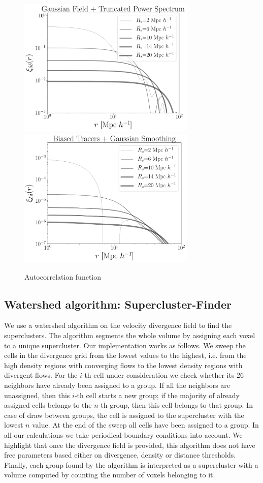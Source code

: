 \documentclass[usenatbib]{mnras}
\begin{document}
\begin{figure}
    \centering
    \includegraphics[width=240pt]{plot_corrfunc_field_rs.pdf}
    \includegraphics[width=240pt]{plot_corrfunc_tracers_rs.pdf}
    \caption{Autocorrelation function}
    \label{fig:power_spectrum}
\end{figure}

\subsection{Watershed algorithm: Supercluster-Finder}

We use a watershed algorithm \citep{BeucherWatershed1979} on the velocity divergence field to find the
superclusters.
The algorithm segments the whole volume by assigning each voxel to a unique supercluster. 
Our implementation works as follows. 
We sweep the cells in the divergence grid from the lowest values to the highest, i.e. from
the high density regions with converging flows to the lowest density regions with divergent
flows.
For the $i$-th cell under consideration we check whether its 26 neighbors have already been assigned to a group. 
If all the neighbors are unassigned, then this $i$-th cell starts a
new group; if the majority of already assigned cells belongs to the
$n$-th group, then this cell belongs to that group.
In case of draw between groups, the cell is assigned to the supercluster with the lowest $n$ value.
At the end of the sweep all cells have been assigned to a group. 
In all our calculations we take periodical boundary conditions into
account.  
We highlight that once the divergence field is provided, this algorithm
does not have free parameters based either on divergence, density or distance thresholds. 
Finally, each group found by the algorithm is interpreted as a supercluster 
with a volume computed by counting the number of voxels belonging to it.
\end{document}
